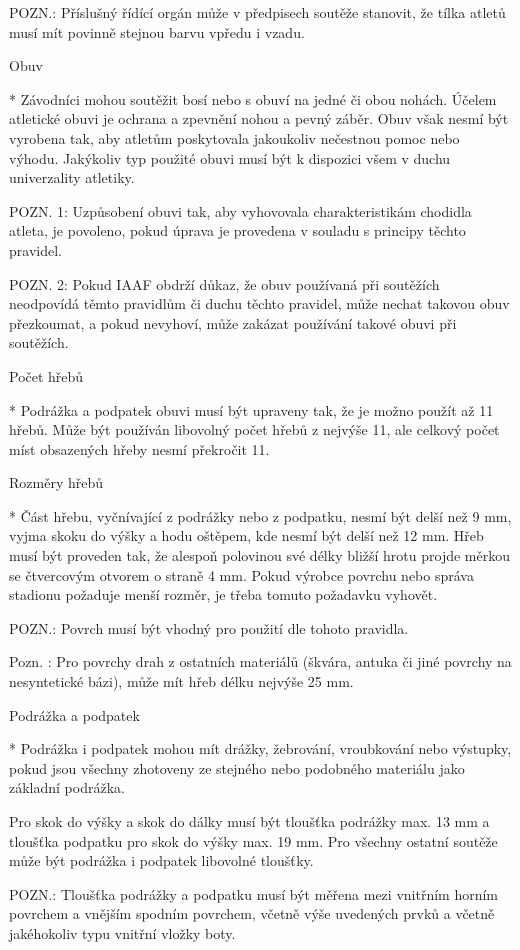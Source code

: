 POZN.: Příslušný řídící orgán může v předpisech soutěže stanovit, že tílka atletů musí mít povinně stejnou barvu vpředu i vzadu.

Obuv

* Závodníci mohou soutěžit bosí nebo s obuví na jedné či obou nohách. Účelem atletické obuvi je ochrana a zpevnění nohou a pevný záběr. Obuv však nesmí být vyrobena tak, aby atletům poskytovala jakoukoliv nečestnou pomoc nebo výhodu. Jakýkoliv typ použité obuvi musí být k dispozici všem v duchu univerzality atletiky.

POZN. 1: Uzpůsobení obuvi tak, aby vyhovovala charakteristikám chodidla atleta, je povoleno, pokud úprava je provedena v souladu s principy těchto pravidel.

POZN. 2: Pokud IAAF obdrží důkaz, že obuv používaná při soutěžích neodpovídá těmto pravidlům či duchu těchto pravidel, může nechat takovou obuv přezkoumat, a pokud nevyhoví, může zakázat používání takové obuvi při soutěžích.

Počet hřebů

* Podrážka a podpatek obuvi musí být upraveny tak, že je možno použít až 11 hřebů. Může být používán libovolný počet hřebů z nejvýše 11, ale celkový počet míst obsazených hřeby nesmí překročit 11.

Rozměry hřebů

* Část hřebu, vyčnívající z podrážky nebo z podpatku, nesmí být delší než 9 mm, vyjma skoku do výšky a hodu oštěpem, kde nesmí být delší než 12 mm. Hřeb musí být proveden tak, že alespoň polovinou své délky bližší hrotu projde měrkou se čtvercovým otvorem o straně 4 mm. Pokud výrobce povrchu nebo správa stadionu požaduje menší rozměr, je třeba tomuto požadavku vyhovět.

POZN.: Povrch musí být vhodný pro použití dle tohoto pravidla.

Pozn. : Pro povrchy drah z ostatních materiálů (škvára, antuka či jiné povrchy na nesyntetické bázi), může mít hřeb délku nejvýše 25 mm.

Podrážka a podpatek

* Podrážka i podpatek mohou mít drážky, žebrování, vroubkování nebo výstupky, pokud jsou všechny zhotoveny ze stejného nebo podobného materiálu jako základní podrážka.

Pro skok do výšky a skok do dálky musí být tloušťka podrážky max. 13 mm a tloušťka podpatku pro skok do výšky max. 19 mm. Pro všechny ostatní soutěže může být podrážka i podpatek libovolné tloušťky.

POZN.: Tloušťka podrážky a podpatku musí být měřena mezi vnitřním horním povrchem a vnějším spodním povrchem, včetně výše uvedených prvků a včetně jakéhokoliv typu vnitřní vložky boty.

